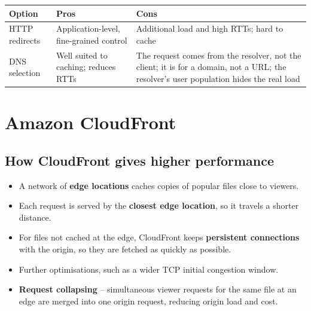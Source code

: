 \documentclass[11pt,a4paper]{article}
\begin{document}

\begin{tabularx}{\textwidth}{@{}lXX@{}}
\toprule
\rowcolor{tablehead}\textbf{Option} & \textbf{Pros} & \textbf{Cons} \\
\midrule
HTTP redirects & Application-level, fine-grained control & Additional load and high RTTs;
  hard to cache \\
\addlinespace
DNS selection & Well suited to caching; reduces RTTs & The request comes from the resolver,
  not the client; it is for a domain, not a URL; the resolver's user population hides the
  real load \\
\bottomrule
\end{tabularx}

\section{Amazon CloudFront}


\subsection{How CloudFront gives higher performance}

\begin{itemize}\itemsep2pt
  \item A network of \textbf{edge locations} caches copies of popular files close to viewers.
  \item Each request is served by the \textbf{closest edge location}, so it travels a shorter
        distance.
  \item For files not cached at the edge, CloudFront keeps \textbf{persistent connections}
        with the origin, so they are fetched as quickly as possible.
  \item Further optimisations, such as a wider TCP initial congestion window.
  \item \textbf{Request collapsing} -- simultaneous viewer requests for the same file at an
        edge are merged into one origin request, reducing origin load and cost.
\end{itemize}
\end{document}
